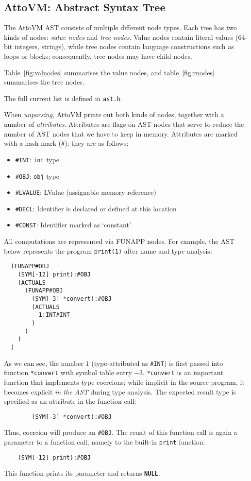 \documentclass[11pt,a4paper]{article}
\newcommand{\Cty}[1]{\textcolor{dblue}{\texttt{#1}}}
\newcommand{\Ckw}[1]{\textbf{\texttt{#1}}}
\begin{document}
\subsection{AttoVM: Abstract Syntax Tree}\label{a:ast}

The AttoVM AST consists of multiple different node types.
Each tree has two kinds of nodes: \emph{value nodes} and \emph{tree nodes}.
Value nodes contain literal values (64-bit integers, strings), while tree nodes
contain language constructions such as loops or blocks; consequently, tree nodes
may have child nodes.

Table~\ref{fig:valnodes} summarises the value nodes, and table~\ref{fig:rnodes} summarises the tree nodes.

The full current list is defined in \texttt{ast.h}.

When \emph{unparsing}, AttoVM prints out both kinds of nodes, together
with a number of \emph{attributes}.  Attributes are flags on AST nodes
that serve to reduce the number of AST nodes that we have to keep in memory.
Attributes are marked with a hash mark (\texttt{\#}); they are as follows:

\begin{itemize}
\item   \texttt{\#INT}: \Cty{int} type
\item   \texttt{\#OBJ}: \Cty{obj} type
\item   \texttt{\#LVALUE}: LValue (assignable memory reference)
\item   \texttt{\#DECL}: Identifier is declared or defined at this location
\item   \texttt{\#CONST}: Identifier marked as `constant'
\end{itemize}

All computations are represented via  \textsf{FUNAPP} nodes.  For example,
the AST below represents the program \texttt{print(1)} after name and type analysis:

\begin{verbatim}
  (FUNAPP#OBJ
    (SYM[-12] print):#OBJ
    (ACTUALS
      (FUNAPP#OBJ
        (SYM[-3] *convert):#OBJ
        (ACTUALS
          1:INT#INT
        )
      )
    )
  )
\end{verbatim}

As we can see, the number $1$ (type-attributed as \texttt{\#INT}) is first passed into function
\texttt{*convert} with symbol table entry $-3$.  \texttt{*convert} is an important function
that implements type coercions; while implicit in the source program, it becomes explicit \emph{in the AST}
during type analysis.
The expected result type is specified as an attribute in the function call:
\begin{verbatim}
        (SYM[-3] *convert):#OBJ
\end{verbatim}
Thus, coercion will produce an \texttt{\#OBJ}.
The reuslt of this function call is again a parameter to a function call,
namely to the built-in
\texttt{print} function:
\begin{verbatim}
    (SYM[-12] print):#OBJ
\end{verbatim}
This function prints its parameter and returns \Ckw{NULL}.
\end{document}
